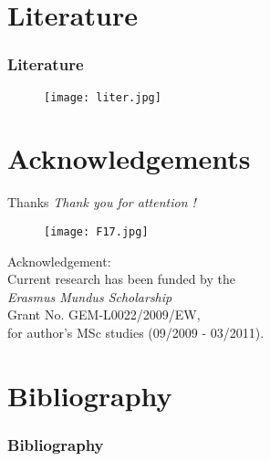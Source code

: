 \documentclass[pdflatex,compress,8pt,
	xcolor={dvipsnames,dvipsnames,svgnames,x11names,table},
	hyperref={colorlinks = true,breaklinks = true, urlcolor = NavyBlue, breaklinks = true}]{beamer}
\begin{document}
\section{Literature}
\begin{frame}\frametitle{Literature}
\begin{figure}[H]
	\centering
		\texttt{[image: liter.jpg]}
\end{figure}
\end{frame}

\section{Acknowledgements}
\begin{frame}{Thanks}
  	\centering \Large 
  	\emph{Thank you for attention !}\\
\begin{figure}[H]
	\centering
		\texttt{[image: F17.jpg]}
\end{figure}
\normalsize
Acknowledgement: \\
Current research has been funded by the \\
\emph{Erasmus Mundus Scholarship} \\
Grant No. GEM-L0022/2009/EW, \\
for author's MSc studies (09/2009 - 03/2011).
\end{frame}


\section{Bibliography}
\begin{frame}\frametitle{Bibliography}
	\nocite{*}
	\printbibliography[heading=none]
\end{frame}

\end{document}
